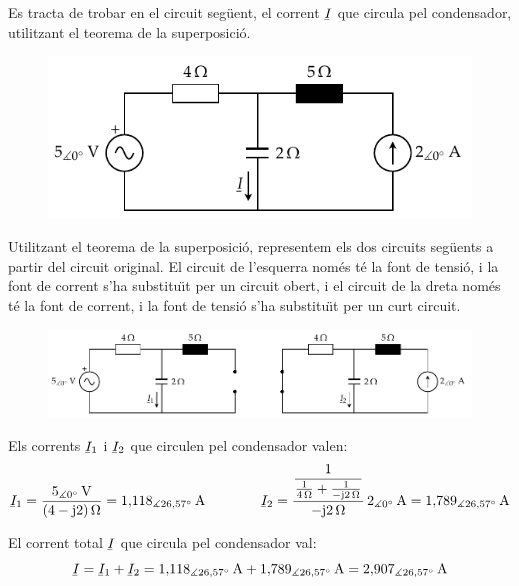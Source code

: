 \begin{exemple}
    Es tracta de trobar en el circuit seg\"{u}ent, el corrent $\cmplx{I}$ que circula
    pel condensador, utilitzant el teorema de la superposici\'{o}.
    \begin{figure}[htb]
        \centering
        \includegraphics{Imatges/Cap-Fonaments-Exemple-Superposicio-1.pdf}
    \end{figure}

    Utilitzant el teorema de la superposici\'{o}, representem els dos
    circuits seg\"{u}ents a partir del circuit original. El circuit de
    l'esquerra nom\'{e}s t\'{e} la font de tensi\'{o}, i la font de corrent s'ha
    substitu\"{\i}t per un circuit obert, i el circuit de
    la dreta nom\'{e}s t\'{e} la font de corrent,  i la font de tensi\'{o}  s'ha
    substitu\"{\i}t per un curt circuit.
    \begin{figure}[htb]
        \centering
        \includegraphics{Imatges/Cap-Fonaments-Exemple-Superposicio-2.pdf}
    \end{figure}

    Els corrents $\cmplx{I}_1$ i $\cmplx{I}_2$ que circulen pel condensador valen:
    \[
        \cmplx{I}_1 = \frac{5_{\measuredangle 0\degree}\unit{V}}{(4-\ju
        2)\unit{\ohm}} = 1{,}118_{\measuredangle
        26{,}57\degree}\unit{A} \qquad\qquad
        \cmplx{I}_2 = \frac{\dfrac{1}{\frac{1}{4\unit{\ohm}}+\frac{1}{-\ju 2\unit{\ohm}}}}
        {-\ju 2\unit{\ohm}} \, 2_{\measuredangle 0\degree}\unit{A} = 1{,}789_{\measuredangle
        26{,}57\degree}\unit{A}
    \]

    El corrent total $\cmplx{I}$ que circula pel condensador val:
    \[
        \cmplx{I}  = \cmplx{I}_1 + \cmplx{I}_2 = 1{,}118_{\measuredangle
        26{,}57\degree}\unit{A} + 1{,}789_{\measuredangle
        26{,}57\degree}\unit{A} =
        2{,}907_{\measuredangle 26{,}57\degree}\unit{A}
    \]
\end{exemple}


